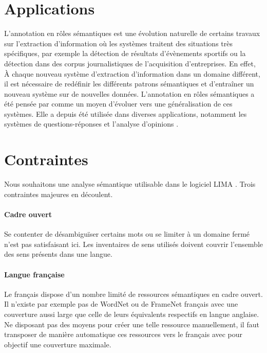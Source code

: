 \section{Applications}

L'annotation en rôles sémantiques est une évolution naturelle de certains
travaux sur l'extraction d'information où les systèmes traitent des situations
très spécifiques, par exemple la détection de résultats d'évènements sportifs
ou la détection dans des corpus journalistiques de l'acquisition d'entreprises.
En effet, À chaque nouveau système d'extraction d'information dans un domaine
différent, il est nécessaire de redéfinir les différents patrons sémantiques et
d'entraîner un nouveau système sur de nouvelles données. L'annotation en rôles
sémantiques a été pensée par \cite{gildea2002automatic} comme un moyen
d'évoluer vers une généralisation de ces systèmes. Elle a depuis été utilisée
dans diverses applications, notamment les systèmes de questions-réponses
\citep{shen2007using} et l'analyse d'opinions \citep{das2012structure}.

\section{Contraintes}

Nous souhaitons une analyse sémantique utilisable dans le logiciel LIMA
\citep{besancon2010lima}. Trois contraintes majeures en découlent.

\paragraph{Cadre ouvert} Se contenter de désambiguïser certains mots ou se
limiter à un domaine fermé n'est pas satisfaisant ici. Les inventaires de sens
utilisés doivent couvrir l'ensemble des sens présents dans une langue.

\paragraph{Langue française} Le français dispose d'un nombre limité de
ressources sémantiques en cadre ouvert. Il n'existe par exemple pas de WordNet
ou de FrameNet français avec une couverture aussi large que celle de leurs
équivalents respectifs en langue anglaise. Ne disposant pas des moyens pour
créer une telle ressource manuellement, il faut transposer de manière
automatique ces ressources vers le français avec pour objectif une couverture
maximale.

